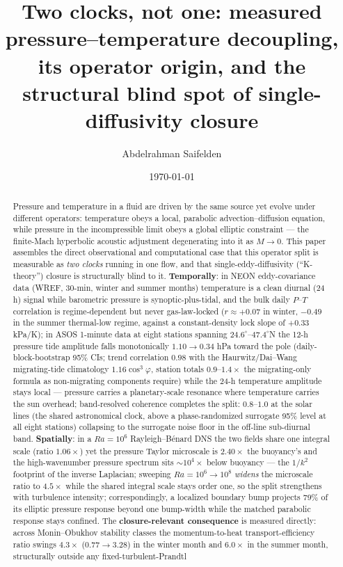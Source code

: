 \documentclass[aps,prfluids,preprint,superscriptaddress,nofootinbib]{revtex4-2}
\begin{document}
\title{Two clocks, not one: measured pressure--temperature decoupling, its operator origin, and the structural blind spot of single-diffusivity closure}

\author{Abdelrahman Saifelden}

\date{\today}

\begin{abstract}
Pressure and temperature in a fluid are driven by the same source yet evolve under different operators: temperature obeys a local, parabolic advection--diffusion equation, while pressure in the incompressible limit obeys a global elliptic constraint --- the finite-Mach hyperbolic acoustic adjustment degenerating into it as $M\to 0$. This paper assembles the direct observational and computational case that this operator split is measurable as \emph{two clocks} running in one flow, and that single-eddy-diffusivity (``K-theory'') closure is structurally blind to it. \textbf{Temporally}: in NEON eddy-covariance data (WREF, 30-min, winter and summer months) temperature is a clean diurnal (24 h) signal while barometric pressure is synoptic-plus-tidal, and the bulk daily $P$--$T$ correlation is regime-dependent but never gas-law-locked ($r\approx +0.07$ in winter, $-0.49$ in the summer thermal-low regime, against a constant-density lock slope of $+0.33$ kPa/K); in ASOS 1-minute data at eight stations spanning $24.6^{\circ}$--$47.4^{\circ}$N the 12-h pressure tide amplitude falls monotonically $1.10\to 0.34$ hPa toward the pole (daily-block-bootstrap 95\% CIs; trend correlation $0.98$ with the Haurwitz/Dai--Wang migrating-tide climatology $1.16\cos^{3}\varphi$, station totals $0.9$--$1.4\times$ the migrating-only formula as non-migrating components require) while the 24-h temperature amplitude stays local --- pressure carries a planetary-scale resonance where temperature carries the sun overhead; band-resolved coherence completes the split: $0.8$--$1.0$ at the solar lines (the shared astronomical clock, above a phase-randomized surrogate 95\% level at all eight stations) collapsing to the surrogate noise floor in the off-line sub-diurnal band. \textbf{Spatially}: in a $Ra=10^{6}$ Rayleigh--B\'enard DNS the two fields share one integral scale (ratio $1.06\times$) yet the pressure Taylor microscale is $2.40\times$ the buoyancy's and the high-wavenumber pressure spectrum sits $\sim 10^{4}\times$ below buoyancy --- the $1/k^{2}$ footprint of the inverse Laplacian; sweeping $Ra=10^{6}\to 10^{8}$ \emph{widens} the microscale ratio to $4.5\times$ while the shared integral scale stays order one, so the split strengthens with turbulence intensity; correspondingly, a localized boundary bump projects 79\% of its elliptic pressure response beyond one bump-width while the matched parabolic response stays confined. The \textbf{closure-relevant consequence} is measured directly: across Monin--Obukhov stability classes the momentum-to-heat transport-efficiency ratio swings $4.3\times$ ($0.77\to 3.28$) in the winter month and $6.0\times$ in the summer month, structurally outside any fixed-turbulent-Prandtl 
\end{abstract}
\end{document}
